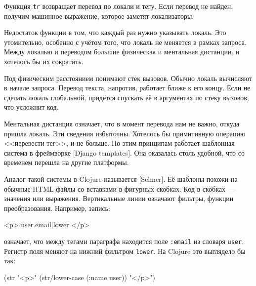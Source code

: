 \fi


Функция \verb|tr| возвращает перевод по локали и тегу. Если перевод не найден,
получим машинное выражение, которое заметят локализаторы.

Недостаток функции в том, что каждый раз нужно указывать локаль. Это
утомительно, особенно с учётом того, что локаль не меняется в рамках
запроса. Между локалью и переводом большие физическая и ментальная
дистанции, и хотелось бы их сократить.


Под физическим расстоянием понимают стек вызовов. Обычно локаль вычисляют в
начале запроса. Перевод текста, напротив, работает ближе к его концу. Если не
сделать локаль глобальной, придётся спускать её в аргументах по стеку вызовов,
что усложнит код.


Ментальная дистанция означает, что в момент перевода нам не важно, откуда пришла
локаль. Эти сведения избыточны. Хотелось бы примитивную операцию <<перевести
тег>>, и не больше. По этим принципам работает шаблонная система в фреймворке
[Django templates].
Она оказалась столь удобной, что со временем перешла на другие платформы.


Аналог такой системы в Clojure называется [Selmer].
Её шаблоны похожи на обычные HTML-файлы со вставками в фигурных скобках. Код в
скобках~--- значения или выражения. Вертикальные линии означают фильтры, функции
преобразования. Например, запись:

\begin{english}
  \begin{htmldjango}
<p>{{ user.email|lower }}</p>
  \end{htmldjango}
\end{english}

\noindent
означает, что между тегами параграфа находится поле \verb|:email| из словаря
\verb|user|. Регистр поля меняют на нижний фильтром \verb|lower|. На Clojure
это выглядело бы так:

\ifnarrow

\begin{english}
  \begin{clojure}
(str "<p>"
     (str/lower-case (:name user))
     "</p>")
  \end{clojure}
\end{english}


